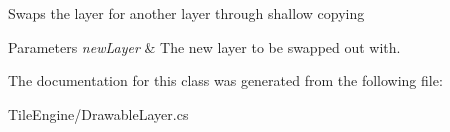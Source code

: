 Swaps the layer for another layer through shallow copying 


\begin{DoxyParams}{Parameters}
{\em new\-Layer} & The new layer to be swapped out with.\\
\hline
\end{DoxyParams}


The documentation for this class was generated from the following file\-:\begin{DoxyCompactItemize}
\item 
Tile\-Engine/Drawable\-Layer.\-cs\end{DoxyCompactItemize}

